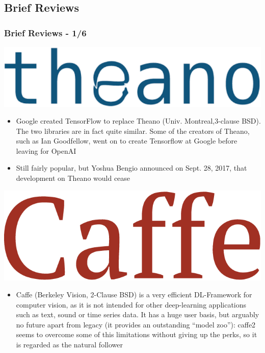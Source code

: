 \documentclass[hyperref={pdfpagelabels=false}]{beamer}
\begin{document}
     \subsection{Brief Reviews} %
     \begin{frame}
       \frametitle{Brief Reviews - 1/6}
       \centering
       \includegraphics[scale=0.08]{logo_theano.png}
       \begin{itemize}[<.->]
       \item \small{Google created TensorFlow to replace Theano (Univ. Montreal,3-clause BSD). The two libraries are in fact quite similar. Some of the creators of Theano, such as Ian Goodfellow, went on to create Tensorflow at Google before leaving for OpenAI\cite{dl4j-review}}
       \item \small{Still fairly popular, but Yoshua Bengio announced on Sept. 28, 2017, that development on Theano would cease\cite{dl4j-review}}
       \end{itemize}

       \vspace{4mm}
       \includegraphics[scale=0.07]{logo_caffe.png}
       \begin{itemize}[<.->]
       \item \small{Caffe (Berkeley Vision, 2-Clause BSD) is a very efficient DL-Framework for computer vision, as it is not intended for other deep-learning applications such as text, sound or time series data\cite{dl4j-review}. It has a huge user basis, but arguably no future apart from legacy (it provides an outstanding ``model zoo''): caffe2 seems to overcome some of this limitations without giving up the perks, so it is regarded as the natural follower}
       \end{itemize}
     \end{frame}
\end{document}
